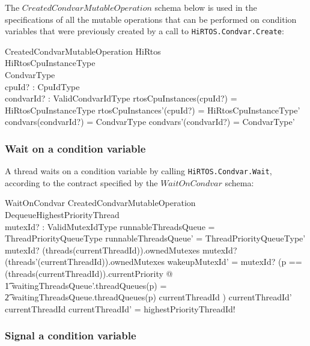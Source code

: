 \documentclass[11pt,letterpaper,twoside,openany]{book}
\begin{document}
The $CreatedCondvarMutableOperation$ schema below is used in the specifications of all the mutable
operations that can be performed on condition variables that were previously created by a call to
\verb'HiRTOS.Condvar.Create':

\begin{schema}{CreatedCondvarMutableOperation}
   \Delta HiRtos \\
   \Delta HiRtosCpuInstanceType \\
   \Delta CondvarType \\
   cpuId? : CpuIdType \\
   condvarId? : ValidCondvarIdType
\where
   rtosCpuInstances(cpuId?) = \theta HiRtosCpuInstanceType
\also
   rtosCpuInstances'(cpuId?) = \theta HiRtosCpuInstanceType'
\also
   condvars(condvarId?) = \theta CondvarType
\also
   condvars'(condvarId?) = \theta CondvarType'
\end{schema}

\subsubsection{Wait on a condition variable}

A thread waits on a condition variable by calling \verb`HiRTOS.Condvar.Wait`, according to the contract
specified by the $WaitOnCondvar$ schema:

\begin{schema}{WaitOnCondvar}
   CreatedCondvarMutableOperation \\
   DequeueHighestPriorityThread \\
   mutexId? : ValidMutexIdType
\where
   runnableThreadsQueue = \theta ThreadPriorityQueueType
\also
   runnableThreadsQueue' = \theta ThreadPriorityQueueType'
\also
   mutexId? \in \ran (threads(currentThreadId)).ownedMutexes
\also
   mutexId? \notin \ran (threads'(currentThreadId)).ownedMutexes
\also
   wakeupMutexId' = mutexId?
\also
   (\LET p == (threads(currentThreadId)).currentPriority @ \\
    \t1 waitingThreadsQueue'.threadQueues(p) = \\
    \t2 waitingThreadsQueue.threadQueues(p) \cat \langle currentThreadId \rangle)
\also
   currentThreadId' \neq currentThreadId
\also
   currentThreadId' = highestPriorityThreadId!
\end{schema}

\subsubsection{Signal a condition variable}
\end{document}
